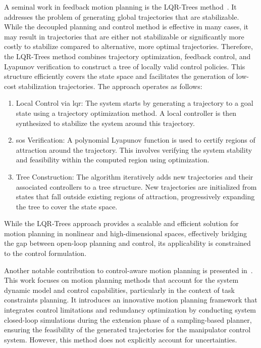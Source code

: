 A seminal work in feedback motion planning is the LQR-Trees method~\cite{cLQRTrees}.
It addresses the problem of generating global trajectories that are stabilizable.
While the decoupled planning and control method is effective in many cases, it may result in trajectories that are either not stabilizable or significantly more costly to stabilize compared to alternative, more optimal trajectories.
Therefore, the LQR-Trees method combines trajectory optimization, feedback control, and Lyapunov verification to construct a tree of locally valid control policies.
This structure efficiently covers the state space and facilitates the generation of low-cost stabilization trajectories.
The approach operates as follows:
\begin{enumerate}
    \item Local Control via \gls{lqr}: The system starts by generating a trajectory to a goal state using a trajectory optimization method. 
    A local  controller is then synthesized to stabilize the system around this trajectory.

    \item \gls{sos} Verification: A polynomial Lyapunov function is used to certify regions of attraction around the trajectory. 
    This involves verifying the system stability and feasibility within the computed region using  optimization.
    
    \item Tree Construction: The algorithm iteratively adds new trajectories and their associated controllers to a tree structure. 
    New trajectories are initialized from states that fall outside existing regions of attraction, progressively expanding the tree to cover the state space.
\end{enumerate}
While the LQR-Trees approach provides a scalable and efficient solution for motion planning in nonlinear and high-dimensional spaces, effectively bridging the gap between open-loop planning and control, its applicability is constrained to the  control formulation.

Another notable contribution to control-aware motion planning is presented in~\cite{cTognon}. 
This work focuses on motion planning methods that account for the system dynamic model and control capabilities, particularly in the context of task constraints planning.
It introduces an innovative motion planning framework that integrates control limitations and redundancy optimization by conducting system closed-loop simulations during the extension phase of a sampling-based planner, ensuring the feasibility of the generated trajectories for the manipulator control system.
However, this method does not explicitly account for uncertainties.

